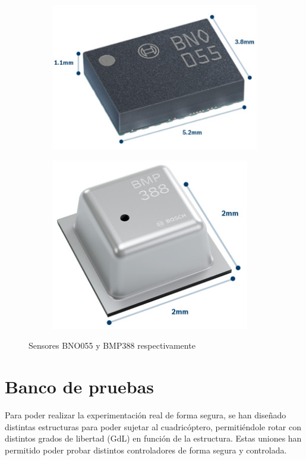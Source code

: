 	
\begin{figure}[htb!]
	\centering
	\begin{subfigure}{0.4\textwidth}
		\centering
		\includegraphics[height=0.5\textwidth]{hardware/bno055.jpeg}
		\label{BNO055}
	\end{subfigure}
	\begin{subfigure}{0.4\textwidth}
		\centering
		\includegraphics[height=0.5\textwidth]{hardware/bmp388.jpeg}
		\label{BMP388}
	\end{subfigure}
	\caption{Sensores BNO055 y BMP388 respectivamente}
\end{figure}


 

\section{Banco de pruebas}
Para poder realizar la experimentación real de forma segura, se han diseñado distintas estructuras para poder sujetar al cuadricóptero, permitiéndole rotar con distintos grados de libertad (GdL) en función de la estructura. Estas uniones han permitido poder probar distintos controladores de forma segura y controlada.


